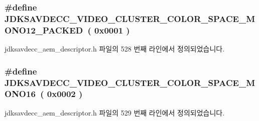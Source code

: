 \subsubsection[{\texorpdfstring{J\+D\+K\+S\+A\+V\+D\+E\+C\+C\+\_\+\+V\+I\+D\+E\+O\+\_\+\+C\+L\+U\+S\+T\+E\+R\+\_\+\+C\+O\+L\+O\+R\+\_\+\+S\+P\+A\+C\+E\+\_\+\+M\+O\+N\+O12\+\_\+\+P\+A\+C\+K\+ED}{JDKSAVDECC_VIDEO_CLUSTER_COLOR_SPACE_MONO12_PACKED}}]{\setlength{\rightskip}{0pt plus 5cm}\#define J\+D\+K\+S\+A\+V\+D\+E\+C\+C\+\_\+\+V\+I\+D\+E\+O\+\_\+\+C\+L\+U\+S\+T\+E\+R\+\_\+\+C\+O\+L\+O\+R\+\_\+\+S\+P\+A\+C\+E\+\_\+\+M\+O\+N\+O12\+\_\+\+P\+A\+C\+K\+ED~( 0x0001 )}\hypertarget{group__video__cluster__color__space_ga6e70754d789518b3c6f8db6838584cce}{}\label{group__video__cluster__color__space_ga6e70754d789518b3c6f8db6838584cce}


jdksavdecc\+\_\+aem\+\_\+descriptor.\+h 파일의 528 번째 라인에서 정의되었습니다.

\subsubsection[{\texorpdfstring{J\+D\+K\+S\+A\+V\+D\+E\+C\+C\+\_\+\+V\+I\+D\+E\+O\+\_\+\+C\+L\+U\+S\+T\+E\+R\+\_\+\+C\+O\+L\+O\+R\+\_\+\+S\+P\+A\+C\+E\+\_\+\+M\+O\+N\+O16}{JDKSAVDECC_VIDEO_CLUSTER_COLOR_SPACE_MONO16}}]{\setlength{\rightskip}{0pt plus 5cm}\#define J\+D\+K\+S\+A\+V\+D\+E\+C\+C\+\_\+\+V\+I\+D\+E\+O\+\_\+\+C\+L\+U\+S\+T\+E\+R\+\_\+\+C\+O\+L\+O\+R\+\_\+\+S\+P\+A\+C\+E\+\_\+\+M\+O\+N\+O16~( 0x0002 )}\hypertarget{group__video__cluster__color__space_gaeb618e42905123dc51b75972e5b5747f}{}\label{group__video__cluster__color__space_gaeb618e42905123dc51b75972e5b5747f}


jdksavdecc\+\_\+aem\+\_\+descriptor.\+h 파일의 529 번째 라인에서 정의되었습니다.

